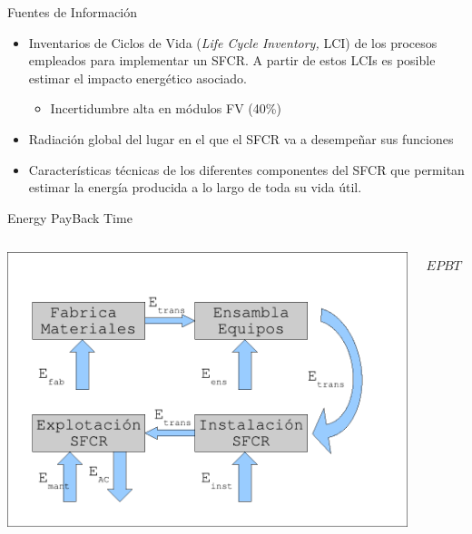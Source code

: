 \documentclass[xcolor={usenames,svgnames,dvipsnames}]{beamer}
\begin{document}
\begin{frame}[label={sec:org4f7efe8}]{Fuentes de Información}
\begin{itemize}
\item \alert{Inventarios de Ciclos de Vida} (\emph{Life Cycle Inventory,} LCI) de los
procesos empleados para implementar un SFCR. A partir de estos LCIs
es posible estimar el impacto energético asociado.

\begin{itemize}
\item Incertidumbre alta en módulos FV (40\%)
\end{itemize}

\item \alert{Radiación global} del lugar en el que el SFCR va a desempeñar sus
funciones

\item \alert{Características técnicas de los diferentes componentes} del SFCR que
permitan estimar la energía producida a lo largo de toda su vida
útil.
\end{itemize}
\end{frame}

\begin{frame}[label={sec:orgb9e08cf}]{Energy PayBack Time}
\begin{columns}
\begin{column}{0.8\columnwidth}
\begin{center}
\includegraphics[width=.9\linewidth]{../figs/LCAFlujo.pdf}
\end{center}
\end{column}

\begin{column}{0.25\columnwidth}
\[
  EPBT=\frac{E_{LCA}}{E_{ac}}
\]
\end{column}
\end{columns}
\end{frame}
\end{document}
